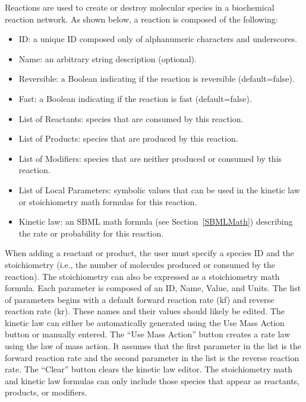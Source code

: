 \documentclass[titlepage,11pt]{article}
\begin{document}
\noindent
Reactions are used to create or destroy molecular species in a
biochemical reaction network.  As shown below, a 
reaction is composed of the following:
\begin{itemize}
\item ID: a unique ID composed only of alphanumeric characters and 
       underscores.
\item Name: an arbitrary string description (optional).
\item Reversible: a Boolean indicating if the reaction is reversible
       (default=false).
\item Fast: a Boolean indicating if the reaction is fast (default=false).
\item List of Reactants: species that are consumed by this reaction.
\item List of Products: species that are produced by this reaction.
\item List of Modifiers: species that are neither produced or consumed 
       by this reaction.
\item List of Local Parameters: symbolic values that can be used in
       the kinetic law or stoichiometry math formulas for this reaction.
\item Kinetic law: an SBML math formula (see Section~\ref{SBMLMath})
       describing the rate or probability for this reaction.
\end{itemize}
When adding a reactant or product, the user must specify a species ID and 
the stoichiometry (i.e., the number of molecules produced or consumed by the
reaction).  The stoichiometry can also be expressed as a stoichiometry math
formula.  Each parameter is composed of an ID, Name, Value, and Units.
The list of parameters begins with a default forward
reaction rate (kf) and reverse reaction rate (kr). These names
and their values should likely be edited. The kinetic law can
either be automatically generated using the Use Mass Action
button or manually entered.  The
``Use Mass Action'' button creates a rate law using the
law of mass action. It assumes that the first parameter in the
list is the forward reaction rate and the second parameter in the
list is the reverse reaction rate.  
The ``Clear'' button clears the kinetic law editor. 
The stoichiometry math and kinetic law formulas can only include
those species that appear as reactants, products, or modifiers.
\end{document}
